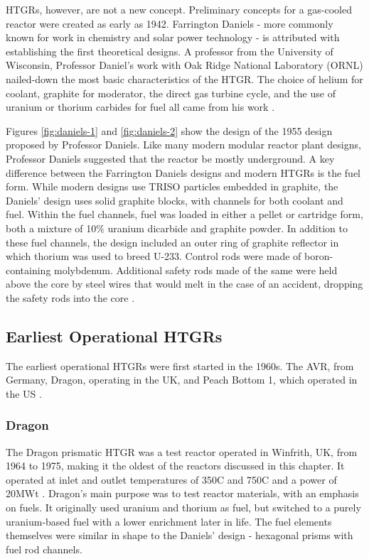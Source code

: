 HTGRs, however, are not a new concept.  Preliminary concepts for a gas-cooled reactor were created as early as 1942.  Farrington Daniels - more commonly known for work in chemistry and solar power technology - is attributed with establishing the first theoretical designs.  A professor from the University of Wisconsin, Professor Daniel's work with Oak Ridge National Laboratory (ORNL) nailed-down the most basic characteristics of the HTGR.  The choice of helium for coolant, graphite for moderator, the direct gas turbine cycle, and the use of uranium or thorium carbides for fuel all came from his work \cite{simnad_early_1991}.




Figures \ref{fig:daniels-1} and \ref{fig:daniels-2} show the design of the 1955 design proposed by Professor Daniels.  Like many modern modular reactor plant designs, Professor Daniels suggested that the reactor be mostly underground.  A key difference between the Farrington Daniels designs and modern HTGRs is the fuel form.  While modern designs use TRISO particles embedded in graphite, the Daniels' design uses solid graphite blocks, with channels for both coolant and fuel.  Within the fuel channels, fuel was loaded in either a pellet or cartridge form, both a mixture of 10$\%$ uranium dicarbide and graphite powder.  In addition to these fuel channels, the design included an outer ring of graphite reflector in which thorium was used to breed U-233.  Control rods were made of boron-containing molybdenum.  Additional safety rods made of the same were held above the core by steel wires that would melt in the case of an accident, dropping the safety rods into the core \cite{simnad_early_1991}.

\subsection{Earliest Operational HTGRs}

The earliest operational HTGRs were first started in the 1960s.  The AVR, from Germany, Dragon, operating in the UK, and Peach Bottom 1, which operated in the US \cite{beck_high_nodate}.

\subsubsection{Dragon}

The Dragon prismatic HTGR was a test reactor operated in Winfrith, UK, from 1964 to 1975, making it the oldest of the reactors discussed in this chapter.  It operated at inlet and outlet temperatures of 350\textdegree  C and 750\textdegree  C and a power of 20MWt \cite{beck_high_nodate}.  Dragon's main purpose was to test reactor materials, with an emphasis on fuels.  It originally used uranium and thorium as fuel, but switched to a purely uranium-based fuel with a lower enrichment later in life.  The fuel elements themselves were similar in shape to the Daniels' design - hexagonal prisms with fuel rod channels.

